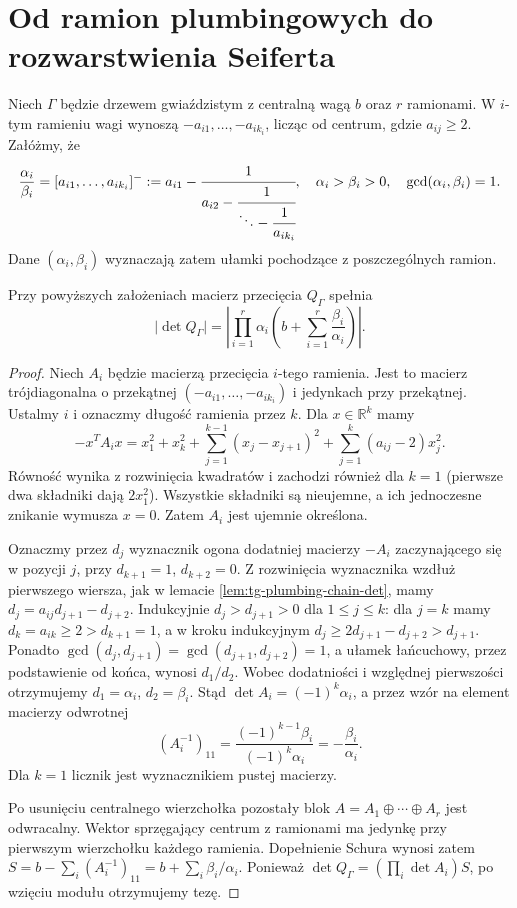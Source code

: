 \section{Od ramion plumbingowych do rozwarstwienia Seiferta}
\label{sec:tg-seifert-stars}

Niech $\Gamma$ będzie drzewem gwiaździstym z centralną
wagą $b$ oraz $r$ ramionami. W $i$-tym ramieniu wagi
wynoszą $-a_{i1},\ldots,-a_{ik_i}$, licząc od centrum,
gdzie $a_{ij}\ge2$. Załóżmy, że
\[
\frac{\alpha_i}{\beta_i}=
[a_{i1},\ldots,a_{ik_i}]^-
:=a_{i1}-\cfrac1{a_{i2}-\cfrac1{\ddots-\cfrac1{a_{ik_i}}}},
\quad \alpha_i>\beta_i>0,\quad\gcd(\alpha_i,\beta_i)=1.
\]
Dane $(\alpha_i,\beta_i)$ wyznaczają zatem ułamki
pochodzące z poszczególnych ramion.

\begin{stwierdzenie}
\label{prop:tg-star-determinant}
Przy powyższych założeniach macierz przecięcia
$Q_\Gamma$ spełnia
\[
\big|\det Q_\Gamma\big|=
\left|\prod_{i=1}^r\alpha_i
\left(b+\sum_{i=1}^r\frac{\beta_i}{\alpha_i}\right)\right|.
\]
\end{stwierdzenie}
\begin{proof}
Niech $A_i$ będzie macierzą przecięcia $i$-tego ramienia.
Jest to macierz trójdiagonalna o przekątnej
$(-a_{i1},\ldots,-a_{ik_i})$ i jedynkach przy
przekątnej. Ustalmy $i$ i oznaczmy długość
ramienia przez $k$. Dla $x\in\mathbb R^k$ mamy
\[
-x^TA_ix=x_1^2+x_k^2+
\sum_{j=1}^{k-1}(x_j-x_{j+1})^2+
\sum_{j=1}^k(a_{ij}-2)x_j^2.
\]
Równość wynika z rozwinięcia kwadratów i zachodzi
również dla $k=1$ (pierwsze dwa składniki dają
$2x_1^2$). Wszystkie składniki są nieujemne,
a ich jednoczesne znikanie wymusza $x=0$.
Zatem $A_i$ jest ujemnie określona.

Oznaczmy przez $d_j$ wyznacznik ogona dodatniej
macierzy $-A_i$ zaczynającego się w pozycji $j$,
przy $d_{k+1}=1$, $d_{k+2}=0$. Z rozwinięcia
wyznacznika wzdłuż pierwszego wiersza, jak w lemacie
\ref{lem:tg-plumbing-chain-det}, mamy
$d_j=a_{ij}d_{j+1}-d_{j+2}$.
Indukcyjnie $d_j>d_{j+1}>0$ dla $1\le j\le k$:
dla $j=k$ mamy $d_k=a_{ik}\ge2>d_{k+1}=1$,
a w kroku indukcyjnym
$d_j\ge2d_{j+1}-d_{j+2}>d_{j+1}$.
Ponadto $\gcd(d_j,d_{j+1})=\gcd(d_{j+1},d_{j+2})=1$,
a ułamek łańcuchowy, przez podstawienie od końca,
wynosi $d_1/d_2$. Wobec dodatniości i względnej
pierwszości otrzymujemy $d_1=\alpha_i$, $d_2=\beta_i$.
Stąd $\det A_i=(-1)^k\alpha_i$, a przez wzór
na element macierzy odwrotnej
\[
(A_i^{-1})_{11}
=\frac{(-1)^{k-1}\beta_i}{(-1)^k\alpha_i}
=-\frac{\beta_i}{\alpha_i}.
\]
Dla $k=1$ licznik jest wyznacznikiem pustej macierzy.

Po usunięciu centralnego wierzchołka pozostały blok
$A=A_1\oplus\cdots\oplus A_r$ jest odwracalny.
Wektor sprzęgający centrum z ramionami ma jedynkę
przy pierwszym wierzchołku każdego ramienia.
Dopełnienie Schura wynosi zatem
$S=b-\sum_i(A_i^{-1})_{11}=b+\sum_i\beta_i/\alpha_i$.
Ponieważ $\det Q_\Gamma=(\prod_i\det A_i)S$,
po wzięciu modułu otrzymujemy tezę.
\end{proof}

